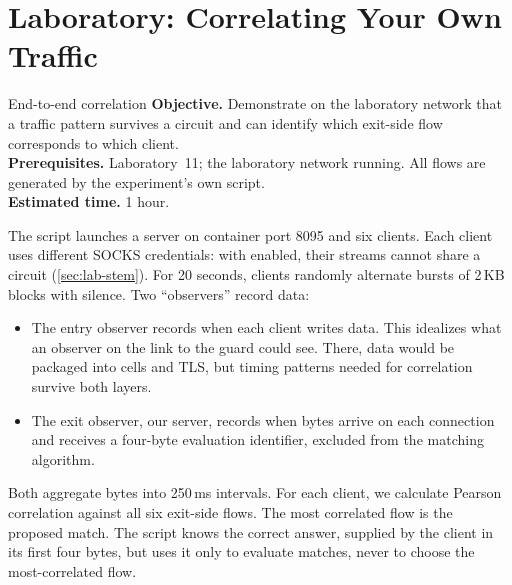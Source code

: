 \section{Laboratory: Correlating Your Own Traffic}\label{sec:lab-attacchi}

\begin{laboratorio}[16]{End-to-end correlation}
\textbf{Objective.} Demonstrate on the laboratory network that a traffic pattern survives a circuit and can identify which exit-side flow corresponds to which client.\\
\textbf{Prerequisites.} Laboratory~11; the laboratory network running. All flows are generated by the experiment's own script.\\
\textbf{Estimated time.} 1 hour.
\end{laboratorio}

The  script launches a server on container port 8095 and six clients. Each client uses different SOCKS credentials: with  enabled, their streams cannot share a circuit (\cref{sec:lab-stem}). For 20 seconds, clients randomly alternate bursts of 2\,KB blocks with silence. Two \enquote{observers} record data:
\begin{itemize}
  \item The entry observer records when each client writes data. This idealizes what an observer on the link to the guard could see. There, data would be packaged into cells and TLS, but timing patterns needed for correlation survive both layers.
  \item The exit observer, our server, records when bytes arrive on each connection and receives a four-byte evaluation identifier, excluded from the matching algorithm.
\end{itemize}
Both aggregate bytes into 250\,ms intervals. For each client, we calculate Pearson correlation against all six exit-side flows. The most correlated flow is the proposed match. The script knows the correct answer, supplied by the client in its first four bytes, but uses it only to evaluate matches, never to choose the most-correlated flow.

